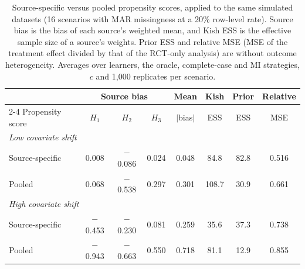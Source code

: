 \begin{table}[ht]
\centering
\caption{Source-specific versus pooled propensity scores, applied to the same simulated datasets (16 scenarios with MAR missingness at a 20\% row-level rate). Source bias is the bias of each source's weighted mean, and Kish ESS is the effective sample size of a source's weights. Prior ESS and relative MSE (MSE of the treatment effect divided by that of the RCT-only analysis) are without outcome heterogeneity. Averages over learners, the oracle, complete-case and MI strategies, $c$ and 1{,}000 replicates per scenario.}
\label{tab:pooled}
\begin{tabular}{lccccccc}
\toprule
 & \multicolumn{3}{c}{Source bias} & Mean & Kish & Prior & Relative \\
\cmidrule(lr){2-4}
Propensity score & $H_1$ & $H_2$ & $H_3$ & $|$bias$|$ & ESS & ESS & MSE \\
\midrule
\multicolumn{8}{l}{\textit{Low covariate shift}} \\
\quad Source-specific & 0.008 & $-$0.086 & 0.024 & 0.048 & 84.8 & 82.8 & 0.516 \\
\quad Pooled & 0.068 & $-$0.538 & 0.297 & 0.301 & 108.7 & 30.9 & 0.661 \\
\multicolumn{8}{l}{\textit{High covariate shift}} \\
\quad Source-specific & $-$0.453 & $-$0.230 & 0.081 & 0.259 & 35.6 & 37.3 & 0.738 \\
\quad Pooled & $-$0.943 & $-$0.663 & 0.550 & 0.718 & 81.1 & 12.9 & 0.855 \\
\bottomrule
\end{tabular}
\end{table}
